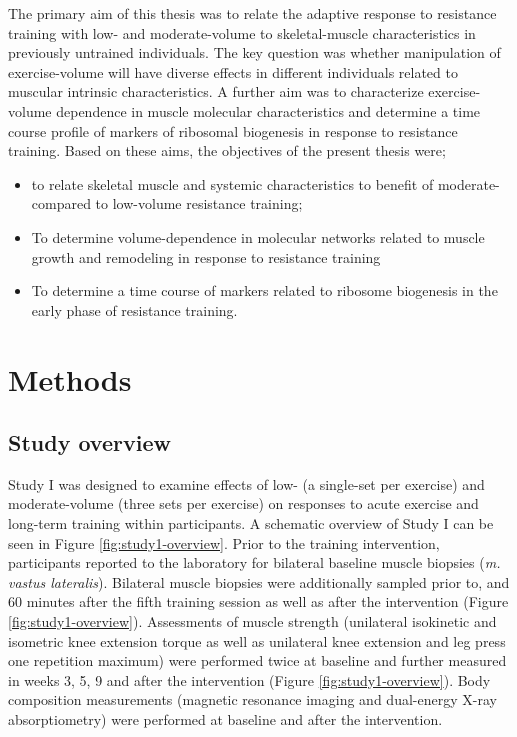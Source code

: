 \documentclass[twoside,10pt]{gihclass} %
\providecommand{\tightlist}{%
  \setlength{\itemsep}{0pt}\setlength{\parskip}{0pt}}
\begin{document}
The primary aim of this thesis was to relate the adaptive response to resistance training with low- and moderate-volume to skeletal-muscle characteristics in previously untrained individuals. The key question was whether manipulation of exercise-volume will have diverse effects in different individuals related to muscular intrinsic characteristics. A further aim was to characterize exercise-volume dependence in muscle molecular characteristics and determine a time course profile of markers of ribosomal biogenesis in response to resistance training. Based on these aims, the objectives of the present thesis were;
\begin{itemize}
\tightlist
\item
  to relate skeletal muscle and systemic characteristics to benefit of moderate- compared to low-volume resistance training;
\item
  To determine volume-dependence in molecular networks related to muscle growth and remodeling in response to resistance training
\item
  To determine a time course of markers related to ribosome biogenesis in the early phase of resistance training.
\end{itemize}
\hypertarget{methods}{%
\chapter{Methods}\label{methods}}

\hypertarget{study-overview}{%
\section{Study overview}\label{study-overview}}

Study I was designed to examine effects of low- (a single-set per exercise) and moderate-volume (three sets per exercise) on responses to acute exercise and long-term training within participants.
A schematic overview of Study I can be seen in Figure \ref{fig:study1-overview}.
Prior to the training intervention, participants reported to the laboratory for bilateral baseline muscle biopsies (\emph{m. vastus lateralis}).
Bilateral muscle biopsies were additionally sampled prior to, and 60 minutes after the fifth training session as well as after the intervention (Figure \ref{fig:study1-overview}).
Assessments of muscle strength (unilateral isokinetic and isometric knee extension torque as well as unilateral knee extension and leg press one repetition maximum) were performed twice at baseline and further measured in weeks 3, 5, 9 and after the intervention (Figure \ref{fig:study1-overview}).
Body composition measurements (magnetic resonance imaging and dual-energy X-ray absorptiometry) were performed at baseline and after the intervention.
\end{document}
